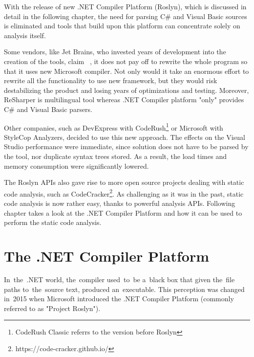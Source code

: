 \documentclass[
  digital, %
  table,   %
  lof,     %
  lot,     %
  oneside,
]{fithesis3}
\begin{document}
With the release of new .NET Compiler Platform (Roslyn), which is discussed in detail in the following chapter, the need for parsing C\# and Visual Basic sources is eliminated and tools that build upon this platform can concentrate solely on analysis itself.

Some vendors, like Jet Brains, who invested years of development into the creation of the tools, claim ~\cite{resharper-and-roslyn-qa}, it does not pay off to rewrite the whole program so that it uses new Microsoft compiler. Not only would it take an enormous effort to rewrite all the functionality to use new framework, but they would risk destabilizing the product and losing years of optimizations and testing. Moreover, ReSharper is multilingual tool whereas .NET Compiler platform "only" provides C\# and Visual Basic parsers.

Other companies, such as DevExpress with CodeRush\footnote{CodeRush Classic referrs to the version before Roslyn} or Microsoft with StyleCop Analyzers, decided to use this new approach. The effects on the Visual Studio performance were immediate, since solution does not have to be parsed by the tool, nor duplicate syntax trees stored. As a result, the load times and memory consumption were significantly lowered.

The Roslyn APIs also gave rise to more open source projects dealing with static code analysis, such as CodeCracker\footnote{https://code-cracker.github.io/}. As challenging as it was in the past, static code analysis is now rather easy, thanks to powerful analysis APIs. Following chapter takes a look at the .NET Compiler Platform and how it can be used to perform the static code analysis.

\chapter{The .NET Compiler Platform}
In~the~.NET world, the~compiler used~to~be a~black box that given the~file paths to~the~source text, produced an~executable. This perception was changed in~2015 when Microsoft introduced the .NET Compiler Platform (commonly referred to as "Project Roslyn").  

\end{document}
